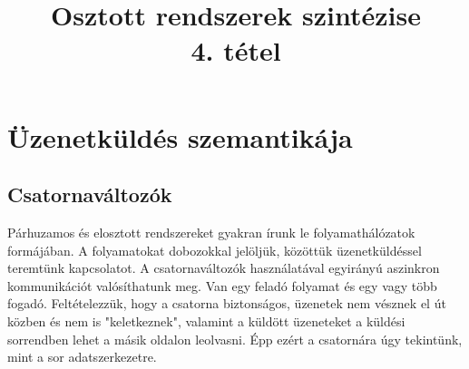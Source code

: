 \documentclass{article}
\title{Osztott rendszerek szintézise\\4. tétel}
\begin{document}

\section*{Üzenetküldés szemantikája}

\subsection*{Csatornaváltozók}

Párhuzamos és elosztott rendszereket gyakran írunk le folyamathálózatok formájában. A folyamatokat dobozokkal jelöljük, közöttük üzenetküldéssel teremtünk kapcsolatot. A csatornaváltozók használatával egyirányú aszinkron kommunikációt valósíthatunk meg. Van egy feladó folyamat és egy vagy több fogadó. Feltételezzük, hogy a csatorna biztonságos, üzenetek nem vésznek el út közben és nem is "keletkeznek", valamint a küldött üzeneteket a küldési sorrendben lehet a másik oldalon leolvasni. Épp ezért a csatornára úgy tekintünk, mint a sor
adatszerkezetre.
\end{document}
